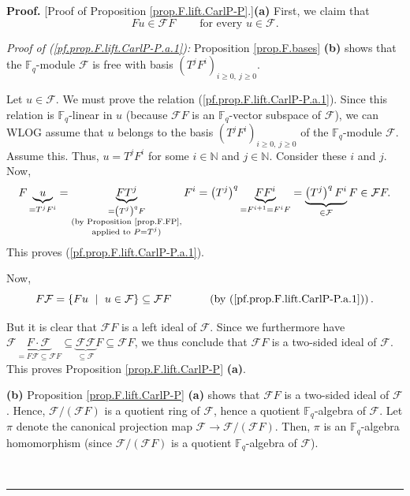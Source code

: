 \documentclass[numbers=enddot,12pt,final,onecolumn,notitlepage]{scrartcl}%
\theoremstyle{definition}
\newenvironment{proof}[1][Proof]{\noindent\textbf{#1.} }{\ \rule{0.5em}{0.5em}}
\begin{document}
\begin{proof}
[Proof of Proposition \ref{prop.F.lift.CarlP-P}.]\textbf{(a)} First, we claim
that%
\begin{equation}
Fu\in\mathcal{F}F\ \ \ \ \ \ \ \ \ \ \text{for every }u\in\mathcal{F}.
\label{pf.prop.F.lift.CarlP-P.a.1}%
\end{equation}


\textit{Proof of (\ref{pf.prop.F.lift.CarlP-P.a.1}):} Proposition
\ref{prop.F.bases} \textbf{(b)} shows that the $\mathbb{F}_{q}$-module
$\mathcal{F}$ is free with basis $\left(  T^{j}F^{i}\right)  _{i\geq
0,\ j\geq0}$.

Let $u\in\mathcal{F}$. We must prove the relation
(\ref{pf.prop.F.lift.CarlP-P.a.1}). Since this relation is $\mathbb{F}_{q}%
$-linear in $u$ (because $\mathcal{F}F$ is an $\mathbb{F}_{q}$-vector subspace
of $\mathcal{F}$), we can WLOG assume that $u$ belongs to the basis $\left(
T^{j}F^{i}\right)  _{i\geq0,\ j\geq0}$ of the $\mathbb{F}_{q}$-module
$\mathcal{F}$. Assume this. Thus, $u=T^{j}F^{i}$ for some $i\in\mathbb{N}$ and
$j\in\mathbb{N}$. Consider these $i$ and $j$. Now,%
\[
F\underbrace{u}_{=T^{j}F^{i}}=\underbrace{FT^{j}}_{\substack{=\left(
T^{j}\right)  ^{q}F\\\text{(by Proposition \ref{prop.F.FP},}\\\text{applied to
}P=T^{j}\text{)}}}F^{i}=\left(  T^{j}\right)  ^{q}\underbrace{FF^{i}%
}_{=F^{i+1}=F^{i}F}=\underbrace{\left(  T^{j}\right)  ^{q}F^{i}}%
_{\in\mathcal{F}}F\in\mathcal{F}F.
\]
This proves (\ref{pf.prop.F.lift.CarlP-P.a.1}).

Now,
\[
F\mathcal{F}=\left\{  Fu\ \mid\ u\in\mathcal{F}\right\}  \subseteq
\mathcal{F}F\ \ \ \ \ \ \ \ \ \ \left(  \text{by
(\ref{pf.prop.F.lift.CarlP-P.a.1})}\right)  .
\]


But it is clear that $\mathcal{F}F$ is a left ideal of $\mathcal{F}$. Since we
furthermore have $\mathcal{F}\underbrace{F\cdot\mathcal{F}}_{=F\mathcal{F}%
\subseteq\mathcal{F}F}\subseteq\underbrace{\mathcal{FF}}_{\subseteq
\mathcal{F}}F\subseteq\mathcal{F}F$, we thus conclude that $\mathcal{F}F$ is a
two-sided ideal of $\mathcal{F}$. This proves Proposition
\ref{prop.F.lift.CarlP-P} \textbf{(a)}. \medskip

\textbf{(b)} Proposition \ref{prop.F.lift.CarlP-P} \textbf{(a)} shows that
$\mathcal{F}F$ is a two-sided ideal of $\mathcal{F}$. Hence, $\mathcal{F}%
/\left(  \mathcal{F}F\right)  $ is a quotient ring of $\mathcal{F}$, hence a
quotient $\mathbb{F}_{q}$-algebra of $\mathcal{F}$. Let $\pi$ denote the
canonical projection map $\mathcal{F}\rightarrow\mathcal{F}/\left(
\mathcal{F}F\right)  $. Then, $\pi$ is an $\mathbb{F}_{q}$-algebra
homomorphism (since $\mathcal{F}/\left(  \mathcal{F}F\right)  $ is a quotient
$\mathbb{F}_{q}$-algebra of $\mathcal{F}$).


\end{proof}
\end{document}
